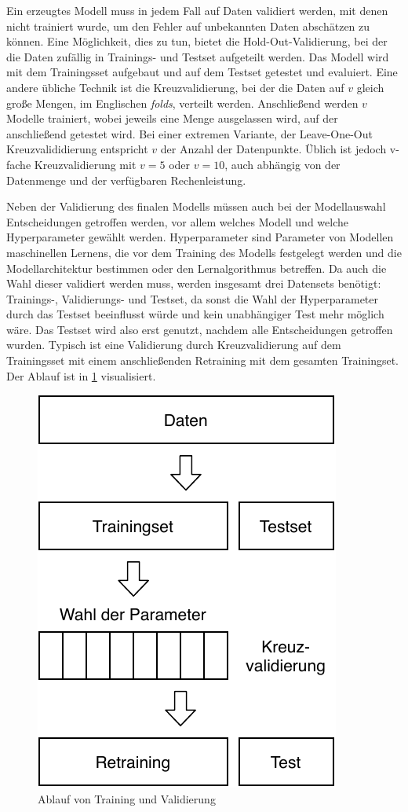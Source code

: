 	Ein erzeugtes Modell muss in jedem Fall auf Daten validiert werden, mit denen nicht trainiert wurde, um den Fehler auf unbekannten Daten abschätzen zu können. Eine Möglichkeit, dies zu tun, bietet die Hold-Out-Validierung, bei der die Daten zufällig in Trainings- und Testset aufgeteilt werden. Das Modell wird mit dem Trainingsset aufgebaut und auf dem Testset getestet und evaluiert. Eine andere übliche Technik ist die Kreuzvalidierung, bei der die Daten auf $v $ gleich große Mengen, im Englischen \textit{folds}, verteilt werden. Anschließend werden $v$ Modelle trainiert, wobei jeweils eine Menge ausgelassen wird, auf der anschließend getestet wird. Bei einer extremen Variante, der Leave-One-Out Kreuzvalididierung entspricht $v$ der Anzahl der Datenpunkte. Üblich ist jedoch v-fache Kreuzvalidierung mit $v=5$ oder $v=10$, auch abhängig von der Datenmenge und der verfügbaren Rechenleistung.
	
	Neben der Validierung des finalen Modells müssen auch bei der Modellauswahl Entscheidungen getroffen werden, vor allem welches Modell und welche Hyperparameter gewählt werden. Hyperparameter sind Parameter von Modellen maschinellen Lernens, die vor dem Training des Modells festgelegt werden und die Modellarchitektur bestimmen oder den Lernalgorithmus betreffen. Da auch die Wahl dieser validiert werden muss, werden insgesamt drei Datensets benötigt: Trainings-, Validierungs- und Testset, da sonst die Wahl der Hyperparameter durch das Testset beeinflusst würde und kein unabhängiger Test mehr möglich wäre. Das Testset wird also erst genutzt, nachdem alle Entscheidungen getroffen wurden. Typisch ist eine Validierung durch Kreuzvalidierung auf dem Trainingsset mit einem anschließenden Retraining mit dem gesamten Trainingset. Der Ablauf ist in \ref{fig:validation-ablauf} visualisiert.
	
	\begin{figure}[H]
		\centering
		\includegraphics[scale=0.8]{pic/validation-ablauf.pdf}
		\caption{Ablauf von Training und Validierung}
		\label{fig:validation-ablauf}
	\end{figure}
	
